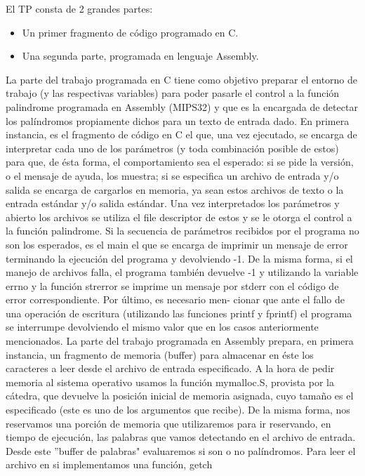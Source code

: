 \documentclass[a4paper,10pt]{article}
\begin{document}
{ \setlength{\parindent}{12pt}

El TP consta de 2 grandes partes:
\begin{itemize}
\item Un primer fragmento de código programado en C.
\item Una segunda parte, programada en lenguaje Assembly.
\end{itemize}

La parte del trabajo programada en C tiene como objetivo preparar el entorno de trabajo (y las respectivas variables) para poder pasarle el control a la función palindrome programada en Assembly (MIPS32) y que es la encargada de detectar los palíndromos propiamente dichos para un texto de entrada dado. En primera instancia, es el fragmento de código en C el que, una vez ejecutado, se encarga de interpretar cada uno de los parámetros (y toda combinación posible de estos) para que, de ésta forma, el comportamiento sea el esperado: si se pide la versión, o el mensaje de ayuda, los muestra; si se especifica un archivo de entrada y/o salida se encarga de cargarlos en memoria, ya sean estos archivos de texto o la entrada estándar y/o salida estándar. Una vez interpretados los parámetros y abierto los archivos se utiliza el file descriptor
de estos y se le otorga el control a la función palindrome. Si la secuencia de parámetros recibidos
por el programa no son los esperados, es el main el que se encarga de imprimir
un mensaje de error terminando la ejecución del programa y devolviendo -1. De la misma forma, si el manejo de archivos falla, el programa también devuelve -1 y utilizando la variable errno y la función strerror
se imprime un mensaje por stderr con el código de error correspondiente. Por último, es necesario men-
cionar que ante el fallo de una operación de escritura (utilizando las funciones printf y fprintf) el programa se interrumpe devolviendo el mismo valor que en los casos anteriormente mencionados. La parte del trabajo programada en Assembly prepara, en primera instancia, un fragmento de memoria (buffer) para almacenar en éste los caracteres a leer desde el archivo de entrada especificado. A la hora de pedir memoria al sistema operativo usamos la función mymalloc.S, provista por la cátedra, que devuelve la posición inicial de memoria asignada, cuyo tamaño es el especificado (este es uno de los argumentos que recibe). De la misma forma, nos reservamos una porción de memoria que utilizaremos para ir reservando, en tiempo de ejecución, las palabras que vamos detectando en el archivo de entrada. Desde este ”buffer de palabras" evaluaremos si son o no palíndromos. Para leer el archivo en si implementamos una función, getch
}
\end{document}
